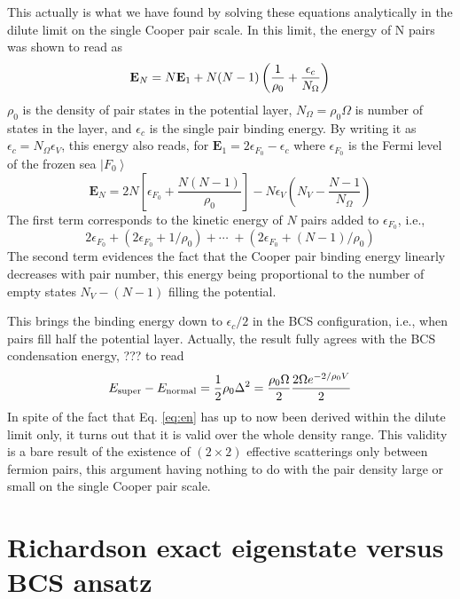 \documentclass[aps,prb,superscriptaddress,twocolumn]{revtex4}
\begin{document}
This actually is what we have found by solving these equations analytically
in the dilute limit on the single Cooper pair scale. In this limit, the
energy of N pairs was shown to read as 
\begin{equation}  \label{eq:en}
\mathbf{E} _N=N\mathbf{E} _1+N(N-1)\left(\frac{1}{\rho_0} +\frac{\epsilon_c}{%
N_\Omega}\right) 
\end{equation}
$\rho_0$ is the density of pair states in the potential layer, $%
N_\Omega=\rho_0\Omega$ is number of states in the layer, and $\epsilon_c$ is
the single pair binding energy. By writing it as $\epsilon_c=N_\Omega%
\epsilon_V$, this energy also reads, for $\mathbf{E} _1=2\epsilon_{F_0}-%
\epsilon_c$ where $\epsilon_{F_0}$ is the Fermi level of the frozen sea $%
\left|F_0\right> $ 
\begin{equation}
\mathbf{E} _N=2N\left[\epsilon_{F_0}+\frac{N(N-1)}{\rho_0}\right]
-N\epsilon_V\left(N_V-\frac{N-1}{N_\Omega}\right) 
\end{equation}
The first term corresponds to the kinetic energy of $N$ pairs added to $%
\epsilon_{F_0}$, i.e., 
\begin{equation}
2\epsilon_{F_0}+\left(2\epsilon_{F_0}+1/\rho_0\right)
+\cdots\;+\left(2\epsilon_{F_0}+(N-1)/\rho_0\right) 
\end{equation}
The second term evidences the fact that the Cooper pair binding energy
linearly decreases with pair number, this energy being proportional to the
number of empty states $N_V-(N-1)$ filling the potential.

This brings the binding energy down to $\epsilon_c/2$ in the BCS
configuration, i.e., when pairs fill half the potential layer. Actually, the
result fully agrees with the BCS condensation energy, ??? to read 
\begin{equation}
E_{\text{super}}-E_\text{normal}=\frac{1}{2} \rho_0\Delta^2=\frac{%
\rho_0\Omega}{2}\frac{2\Omega{e^{-2/\rho_0V}}}{2}
\end{equation}
In spite of the fact that Eq. \eqref{eq:en} has up to now been derived
within the dilute limit only, it turns out that it is valid over the whole
density range. This validity is a bare result of the existence of $(2\times2)
$ effective scatterings only between fermion pairs, this argument having
nothing to do with the pair density large or small on the single Cooper pair
scale.

\section{Richardson exact eigenstate versus BCS ansatz \label{sec:conn}}
\end{document}
